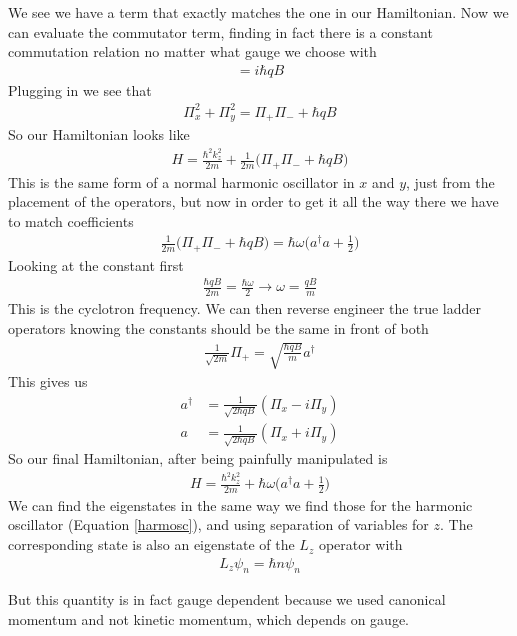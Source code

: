 We see we have a term that exactly matches the one in our Hamiltonian. Now we can evaluate the commutator term, finding in fact there is a constant commutation relation no matter what gauge we choose with
\begin{align}
    [\Pi_x,\Pi_y] = i\hbar qB
\end{align}
Plugging in we see that
\begin{align}
    \Pi_x^2 + \Pi_y^2 = \Pi_+\Pi_- + \hbar qB
\end{align}
So our Hamiltonian looks like
\begin{align}
    H = \frac{\hbar^2k_z^2}{2m} + \frac{1}{2m}\Big(\Pi_+\Pi_- + \hbar qB\Big)
\end{align}
This is the same form of a normal harmonic oscillator in $x$ and $y$, just from the placement of the operators, but now in order to get it all the way there we have to match coefficients
\begin{align}
    \frac{1}{2m}\Big(\Pi_+\Pi_- + \hbar qB\Big) = \hbar\omega\Big(a^\dagger a + \frac{1}{2}\Big)
\end{align}
Looking at the constant first
\begin{align}
    \frac{\hbar qB}{2m} = \frac{\hbar\omega}{2} \rightarrow \omega = \frac{qB}{m}
\end{align}
This is the cyclotron frequency. We can then reverse engineer the true ladder operators knowing the constants should be the same in front of both
\begin{align}
    \frac{1}{\sqrt{2m}}\Pi_+ = \sqrt{\frac{\hbar qB}{m}}a^\dagger 
\end{align}
This gives us
\begin{align}
    a^\dagger &= \frac{1}{\sqrt{2\hbar q B}} (\Pi_x - i\Pi_y)\\
    a &= \frac{1}{\sqrt{2\hbar q B}} (\Pi_x + i\Pi_y)
\end{align}
So our final Hamiltonian, after being painfully manipulated is
\begin{align}
H = \frac{\hbar^2k_z^2}{2m} + \hbar\omega\Big(a^\dagger a + \frac{1}{2}\Big)
\end{align}
We can find the eigenstates in the same way we find those for the harmonic oscillator (Equation \ref{harmosc}), and using separation of variables for $z$. The corresponding state is also an eigenstate of the $L_z$ operator with
\begin{align}
L_z\psi_n = \hbar n\psi_n
\end{align}

But this quantity is in fact gauge dependent because we used canonical momentum and not kinetic momentum, which depends on gauge.

